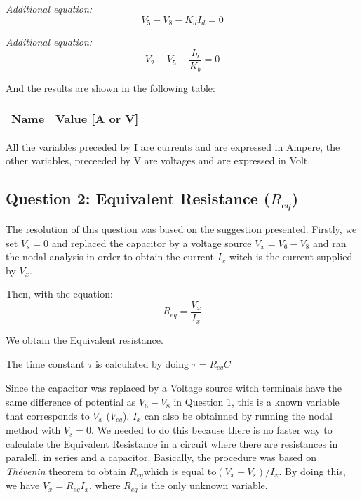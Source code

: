 \emph{Additional equation:}
\begin{equation}
     V_5 - V_8 - K_dI_d = 0
\end{equation}\par

\emph{Additional equation:}
\begin{equation}
     V_2 - V_5 - \frac{I_b}{K_b} = 0
\end{equation}\par

And the results are shown in the following table:

\begin{center}
  \begin{tabular}{ | c | c | }
    \hline    
    {\bf Name} & {\bf Value [A or V]} \\ \hline
    \hline
  \end{tabular}
\end{center}
All the variables preceded by I are currents and are expressed in Ampere, the other variables, preceeded by V are voltages and are expressed in Volt.



\subsection{Question 2: Equivalent Resistance ($R_{eq}$)}
The resolution of this question was based on the suggestion presented. Firstly, we set $V_s =0$ and replaced the capacitor by a voltage source $V_x = V_6 - V_8$ and ran the nodal analysis in order to obtain the current $I_x$ witch is the current supplied by $V_x$.\par
Then, with the equation: 
\begin{equation}
     R_{eq} = \frac{V_x}{I_x}
\end{equation}\par
We obtain the Equivalent resistance. \par 
The time constant $\tau$ is calculated by doing $\tau=R_{eq}C$\par
 Since the capacitor was replaced by a Voltage source witch terminals have the same difference of potential as $V_6 - V_8$ in Question 1, this is a known variable that corresponds to $V_x$ ($V_{eq}$). $I_x$ can also be obtainned by running the nodal method with $V_s = 0$. We needed to do this because there is no faster way to calculate the Equivalent Resistance in a circuit where there are resistances in paralell, in series and a capacitor. Basically, the procedure was based on \emph{Thévenin} theorem to obtain $R_{eq}$which is equal to$(V_{x}-V_{s})/I_{x} $. By doing this, we have $V_{x}=R_{eq}I_x$, where $R_{eq}$ is the only unknown variable. \par

